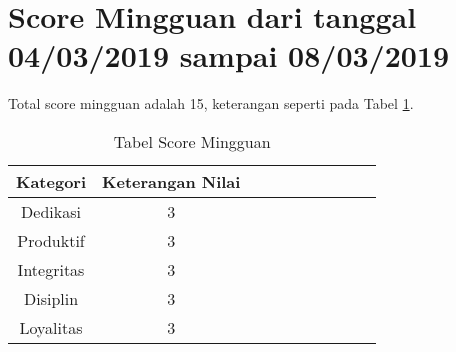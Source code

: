 \section{Score Mingguan dari tanggal 04/03/2019 sampai 08/03/2019}
Total score mingguan adalah 15,  keterangan seperti pada Tabel \ref{table:scoremingguan}.
\begin{table}[!ht]
\centering
\begin{tabular}{ |c|c|c|c|c|c|c|c|c|c| }
\hline
Kategori & Keterangan Nilai \\
\hline
Dedikasi & 3 \\
\hline
Produktif & 3 \\
\hline
Integritas & 3 \\
\hline
Disiplin & 3 \\
\hline
Loyalitas & 3 \\
\hline
\end{tabular}
\caption{Tabel Score Mingguan}
\label{table:scoremingguan}
\end{table}
